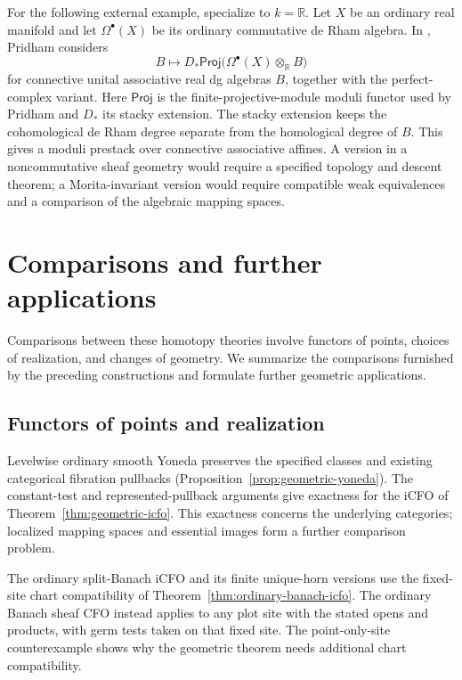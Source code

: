 \documentclass[12pt]{amsart}
\theoremstyle{definition}
\theoremstyle{remark}
\numberwithin{equation}{section}
\newcommand{\R}{\mathbb R}
\begin{document}
For the following external example, specialize to $k=\R$.
Let $X$ be an ordinary real manifold and let $\Omega^\bullet(X)$
be its ordinary commutative de Rham algebra. In
\cite[Example~3.15, pp.~34--35]{PridhamNC2023}, Pridham considers
\[
 B\longmapsto D_*\mathsf{Proj}
          \bigl(\Omega^\bullet(X)\otimes_\R B\bigr)
\]
for connective unital associative real dg algebras $B$, together
with the perfect-complex variant. Here $\mathsf{Proj}$ is the
finite-projective-module moduli functor used by Pridham and $D_*$
its stacky extension.
The stacky extension keeps the cohomological de Rham degree
separate from the homological degree of $B$.
This gives a moduli prestack over connective
associative affines. A version in a noncommutative sheaf
geometry would require a specified topology and descent
theorem; a Morita-invariant version would require compatible
weak equivalences and a comparison of the algebraic mapping spaces.

\section{Comparisons and further applications}
\label{sec:comparisons}

Comparisons between these homotopy theories involve functors
of points, choices of realization, and changes of geometry.
We summarize the comparisons furnished by the preceding
constructions and formulate further geometric applications.

\subsection{Functors of points and realization}

Levelwise ordinary smooth Yoneda preserves the specified
classes and existing categorical fibration pullbacks
(Proposition~\ref{prop:geometric-yoneda}).
The constant-test and represented-pullback arguments give
exactness for the iCFO of Theorem~\ref{thm:geometric-icfo}.
This exactness concerns the underlying categories;
localized mapping spaces and essential images form
a further comparison problem.

The ordinary split-Banach iCFO and its finite unique-horn
versions use the fixed-site chart compatibility of
Theorem~\ref{thm:ordinary-banach-icfo}. The ordinary
Banach sheaf CFO instead applies to any plot site with
the stated opens and products, with germ tests taken
on that fixed site. The point-only-site counterexample
shows why the geometric theorem needs additional
chart compatibility.
\end{document}
